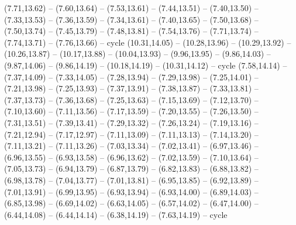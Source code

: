 {  (7.71,13.62) -- (7.60,13.64) -- (7.53,13.61) -- (7.44,13.51) -- (7.40,13.50) -- (7.33,13.53) -- (7.36,13.59) -- (7.34,13.61) -- (7.40,13.65) -- (7.50,13.68) -- (7.50,13.74) -- (7.45,13.79) -- (7.48,13.81) -- (7.54,13.76) -- (7.71,13.74) -- (7.74,13.71) -- (7.76,13.66) -- cycle
  (10.31,14.05) -- (10.28,13.96) -- (10.29,13.92) -- (10.26,13.87) -- (10.17,13.88) -- (10.04,13.93) -- (9.96,13.95) -- (9.86,14.03) -- (9.87,14.06) -- (9.86,14.19) -- (10.18,14.19) -- (10.31,14.12) -- cycle
  (7.58,14.14) -- (7.37,14.09) -- (7.33,14.05) -- (7.28,13.94) -- (7.29,13.98) -- (7.25,14.01) -- (7.21,13.98) -- (7.25,13.93) -- (7.37,13.91) -- (7.38,13.87) -- (7.33,13.81) -- (7.37,13.73) -- (7.36,13.68) -- (7.25,13.63) -- (7.15,13.69) -- (7.12,13.70) -- (7.10,13.60) -- (7.11,13.56) -- (7.17,13.59) -- (7.20,13.55) -- (7.26,13.50) -- (7.31,13.51) -- (7.39,13.41) -- (7.29,13.32) -- (7.26,13.24) -- (7.19,13.16) -- (7.21,12.94) -- (7.17,12.97) -- (7.11,13.09) -- (7.11,13.13) -- (7.14,13.20) -- (7.11,13.21) -- (7.11,13.26) -- (7.03,13.34) -- (7.02,13.41) -- (6.97,13.46) -- (6.96,13.55) -- (6.93,13.58) -- (6.96,13.62) -- (7.02,13.59) -- (7.10,13.64) -- (7.05,13.73) -- (6.94,13.79) -- (6.87,13.79) -- (6.82,13.83) -- (6.88,13.82) -- (6.98,13.78) -- (7.04,13.77) -- (7.01,13.81) -- (6.95,13.85) -- (6.92,13.89) -- (7.01,13.91) -- (6.99,13.95) -- (6.93,13.94) -- (6.93,14.00) -- (6.89,14.03) -- (6.85,13.98) -- (6.69,14.02) -- (6.63,14.05) -- (6.57,14.02) -- (6.47,14.00) -- (6.44,14.08) -- (6.44,14.14) -- (6.38,14.19) -- (7.63,14.19) -- cycle}
